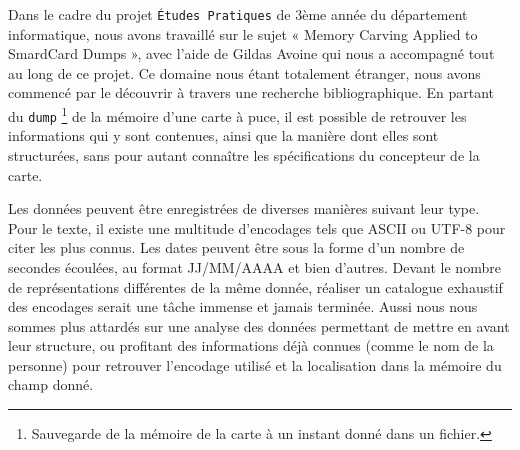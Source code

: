 Dans le cadre du projet \texttt{Études Pratiques} de 3ème année du département informatique, nous avons travaillé sur le sujet « Memory Carving Applied to SmardCard Dumps », avec l'aide de Gildas Avoine qui nous a accompagné tout au long de ce projet. Ce domaine nous étant totalement étranger, nous avons commencé par le découvrir à travers une recherche bibliographique. En partant du \texttt{dump} \footnote{Sauvegarde de la mémoire de la carte à un instant donné dans un fichier.} de la mémoire d'une carte à puce, il est possible de retrouver les informations qui y sont contenues, ainsi que la manière dont elles sont structurées, sans pour autant connaître les spécifications du concepteur de la carte.

Les données peuvent être enregistrées de diverses manières suivant leur type. Pour le texte, il existe une multitude d'encodages tels que ASCII \cite{ASCII} ou UTF-8 \cite{UTF8} pour citer les plus connus. Les dates peuvent être sous la forme d'un nombre de secondes écoulées, au format JJ/MM/AAAA et bien d'autres. Devant le nombre de représentations différentes de la même donnée, réaliser un catalogue exhaustif des encodages serait une tâche immense et jamais terminée. Aussi nous nous sommes plus attardés sur une analyse des données permettant de mettre en avant leur structure, ou profitant des informations déjà connues (comme le nom de la personne) pour retrouver l'encodage utilisé et la localisation dans la mémoire du champ donné.
